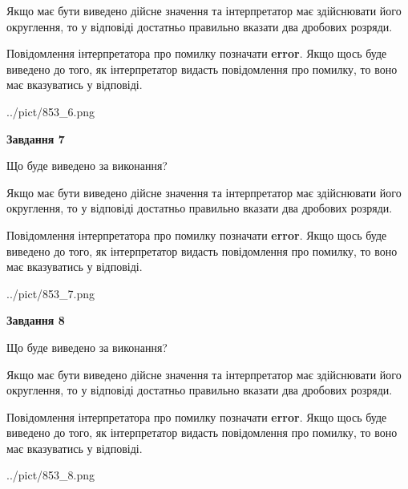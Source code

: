 \documentclass[12pt, ukrainian]{article}
\begin{document}
{\begin {Large}
Якщо має бути виведено дійсне значення та інтерпретатор має здійснювати його округлення, 
то у відповіді достатньо правильно вказати два дробових розряди.

Повідомлення інтерпретатора про помилку позначати \textbf{error}.
Якщо щось буде виведено до того, як інтерпретатор видасть повідомлення про помилку, 
то воно має вказуватись у відповіді. \par

\begin{center}
	{../pict/853_6.png}
\end{center}
\newpage

{\begin {center}\textbf{Завдання 7}\end {center}}\par
Що буде виведено за виконання? \par

Якщо має бути виведено дійсне значення та інтерпретатор має здійснювати його округлення, 
то у відповіді достатньо правильно вказати два дробових розряди.

Повідомлення інтерпретатора про помилку позначати \textbf{error}.
Якщо щось буде виведено до того, як інтерпретатор видасть повідомлення про помилку, 
то воно має вказуватись у відповіді. \par

\begin{center}
	{../pict/853_7.png}
\end{center}
\newpage

{\begin {center}\textbf{Завдання 8}\end {center}}\par
Що буде виведено за виконання? \par

Якщо має бути виведено дійсне значення та інтерпретатор має здійснювати його округлення, 
то у відповіді достатньо правильно вказати два дробових розряди.

Повідомлення інтерпретатора про помилку позначати \textbf{error}.
Якщо щось буде виведено до того, як інтерпретатор видасть повідомлення про помилку, 
то воно має вказуватись у відповіді. \par

\begin{center}
	{../pict/853_8.png}
\end{center}
\newpage


\end{Large}}
\end{document}
